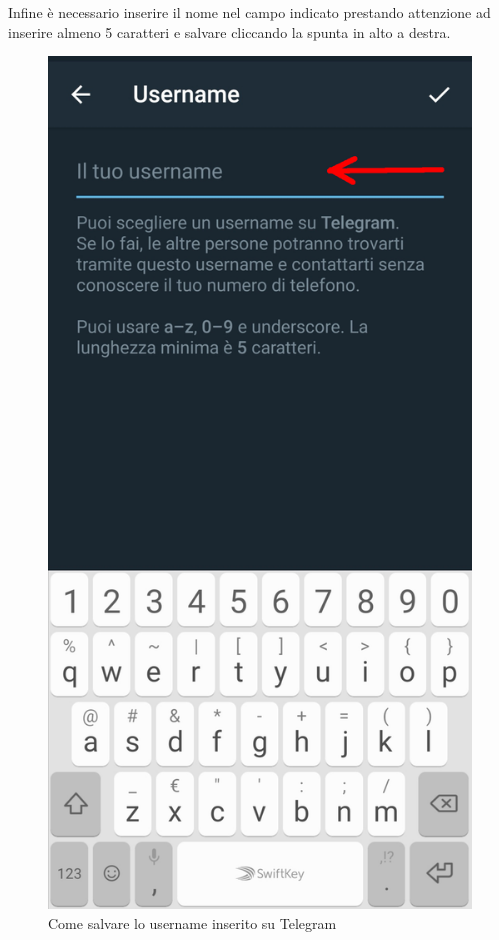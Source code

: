 		Infine è necessario inserire il nome nel campo indicato prestando attenzione ad inserire almeno 5 caratteri e salvare cliccando la spunta in alto a destra.
		\begin{figure}[H]
			\centering
			\includegraphics[scale=0.110]{res/images/telegram3.jpg}
			\caption{Come salvare lo username inserito su Telegram}
			\label{Screenshot3}
		\end{figure}

